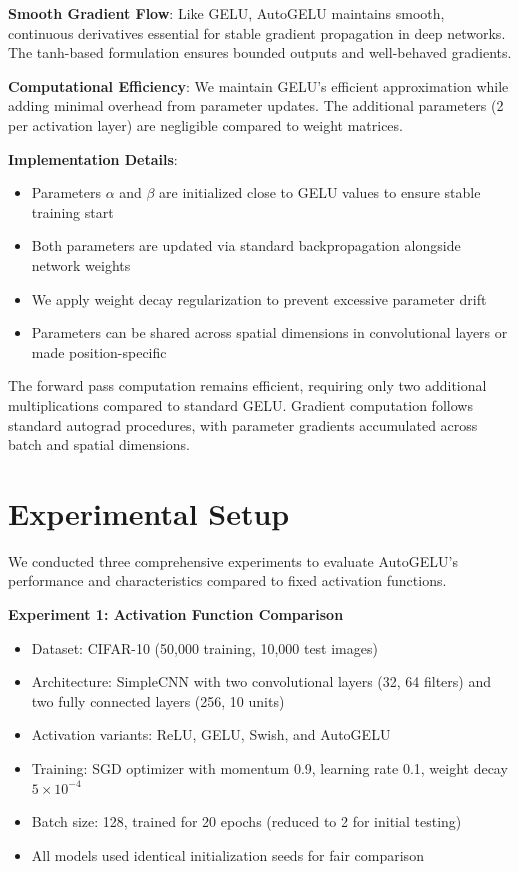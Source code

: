 \documentclass{article} %
\begin{document}
\textbf{Smooth Gradient Flow}: Like GELU, AutoGELU maintains smooth, continuous derivatives essential for stable gradient propagation in deep networks. The tanh-based formulation ensures bounded outputs and well-behaved gradients.

\textbf{Computational Efficiency}: We maintain GELU's efficient approximation while adding minimal overhead from parameter updates. The additional parameters (2 per activation layer) are negligible compared to weight matrices.

\textbf{Implementation Details}:
\begin{itemize}
\item Parameters $\alpha$ and $\beta$ are initialized close to GELU values to ensure stable training start
\item Both parameters are updated via standard backpropagation alongside network weights  
\item We apply weight decay regularization to prevent excessive parameter drift
\item Parameters can be shared across spatial dimensions in convolutional layers or made position-specific
\end{itemize}

The forward pass computation remains efficient, requiring only two additional multiplications compared to standard GELU. Gradient computation follows standard autograd procedures, with parameter gradients accumulated across batch and spatial dimensions.

\section{Experimental Setup}

We conducted three comprehensive experiments to evaluate AutoGELU's performance and characteristics compared to fixed activation functions.

\textbf{Experiment 1: Activation Function Comparison}
\begin{itemize}
\item Dataset: CIFAR-10 (50,000 training, 10,000 test images)
\item Architecture: SimpleCNN with two convolutional layers (32, 64 filters) and two fully connected layers (256, 10 units)
\item Activation variants: ReLU, GELU, Swish, and AutoGELU
\item Training: SGD optimizer with momentum 0.9, learning rate 0.1, weight decay $5 \times 10^{-4}$
\item Batch size: 128, trained for 20 epochs (reduced to 2 for initial testing)
\item All models used identical initialization seeds for fair comparison
\end{itemize}
\end{document}
